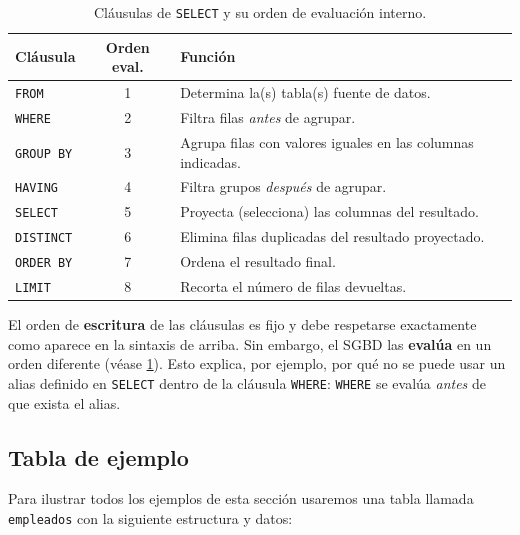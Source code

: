 \begin{table}[H]
\centering
\small
\renewcommand{\arraystretch}{1.4}
\begin{tabularx}{\linewidth}{@{} l c X @{}}
\toprule
\textbf{Cláusula} & \textbf{Orden eval.} & \textbf{Función} \\
\midrule
\texttt{FROM}     & 1 & Determina la(s) tabla(s) fuente de datos. \\
\texttt{WHERE}    & 2 & Filtra filas \textit{antes} de agrupar. \\
\texttt{GROUP BY} & 3 & Agrupa filas con valores iguales en las columnas indicadas. \\
\texttt{HAVING}   & 4 & Filtra grupos \textit{después} de agrupar. \\
\texttt{SELECT}   & 5 & Proyecta (selecciona) las columnas del resultado. \\
\texttt{DISTINCT} & 6 & Elimina filas duplicadas del resultado proyectado. \\
\texttt{ORDER BY} & 7 & Ordena el resultado final. \\
\texttt{LIMIT}    & 8 & Recorta el número de filas devueltas. \\
\bottomrule
\end{tabularx}
\caption{Cláusulas de \texttt{SELECT} y su orden de evaluación interno.}
\label{tab:clausulas-select}
\end{table}

\begin{nota}
El orden de \textbf{escritura} de las cláusulas es fijo y debe
respetarse exactamente como aparece en la sintaxis de arriba.
Sin embargo, el SGBD las \textbf{evalúa} en un orden diferente
(véase \cref{tab:clausulas-select}).
Esto explica, por ejemplo, por qué no se puede usar un alias
definido en \texttt{SELECT} dentro de la cláusula \texttt{WHERE}:
\texttt{WHERE} se evalúa \textit{antes} de que exista el alias.
\end{nota}

\subsection{Tabla de ejemplo}

Para ilustrar todos los ejemplos de esta sección usaremos una tabla
llamada \texttt{empleados} con la siguiente estructura y datos:

